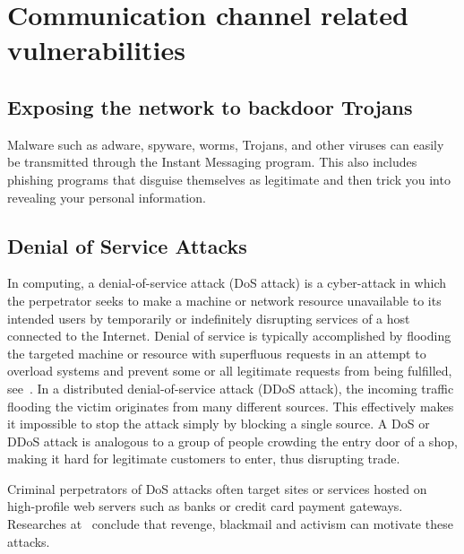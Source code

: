 \section{Communication channel related vulnerabilities}\label{sec:communication-channel-vulnerabilities}

\subsection{Exposing the network to backdoor Trojans}\label{subsec:exposing-the-network-to-backdoor-trojans}
Malware such as adware, spyware, worms, Trojans, and other viruses can easily be transmitted through the
Instant Messaging program.
This also includes phishing programs that disguise themselves as legitimate and then trick you into revealing
your personal information.

\subsection{Denial of Service Attacks}\label{subsec:denial-of-service-attacks}
In computing, a denial-of-service attack (DoS attack) is a cyber-attack in which the perpetrator seeks to make a machine or
network resource unavailable to its intended users by temporarily or indefinitely disrupting services of a host connected
to the Internet.
Denial of service is typically accomplished by flooding the targeted machine or resource with superfluous requests in
an attempt to overload systems and prevent some or all legitimate requests from being fulfilled, see~\cite{gu2007denial}.
In a distributed denial-of-service attack (DDoS attack), the incoming traffic flooding the victim originates from
many different sources.
This effectively makes it impossible to stop the attack simply by blocking a single source.
A DoS or DDoS attack is analogous to a group of people crowding the entry door of a shop, making it hard for legitimate
customers to enter, thus disrupting trade.

Criminal perpetrators of DoS attacks often target sites or services hosted on high-profile web servers such as banks or
credit card payment gateways.
Researches at~\cite{prince2016empty, halpin2012philosophy} conclude that revenge, blackmail and activism can
motivate these attacks.

